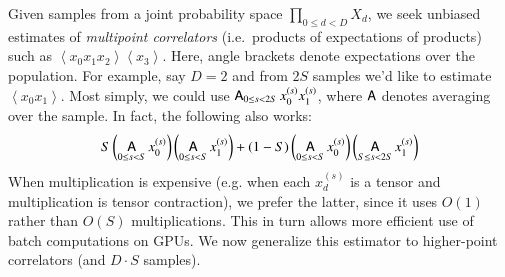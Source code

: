 \documentclass[anon,12pt]{colt2021} %
\newcommand{\wrap}[1]{\left(#1\right)}
\newcommand{\wang}[1]{\left\langle#1\right\rangle}
\DeclareMathOperator*{\Avg}{\text{\sffamily A}}
\begin{document}
        Given samples from a joint probability space $\prod_{0\leq d<D} X_d$,
        we seek unbiased estimates of \emph{multipoint correlators} (i.e.\ products of
        expectations of products) such as $\wang{x_0 x_1 x_2}\wang{x_3}$.  Here,
        angle brackets denote expectations over the population. 
        For
        example, say $D=2$ and from $2S$ samples we'd like to estimate
        $\wang{x_0 x_1}$.  Most simply, we could use $\Avg_{0\leq s<2S}
        x_0^{(s)} x_1^{(s)}$, where $\Avg$ denotes averaging over the sample.  In fact, the
        following also works:
        \begin{equation} \label{eq:bessel}
            S
            \wrap{\Avg_{0\leq s< S} x_0^{(s)}}
            \wrap{\Avg_{0\leq s< S} x_1^{(s)}}
            +
            (1-S)
            \wrap{\Avg_{0\leq s< S} x_0^{(s)}}
            \wrap{\Avg_{S\leq s<2S} x_1^{(s)}}
        \end{equation}
        When multiplication is expensive (e.g. when each $x_d^{(s)}$ is a
        tensor and multiplication is tensor contraction), we prefer the latter,
        since it uses $O(1)$ rather than $O(S)$ multiplications.  This in turn
        allows more efficient use of batch computations on GPUs.  We now
        generalize this estimator to higher-point correlators (and $D\cdot S$
        samples).
\end{document}

